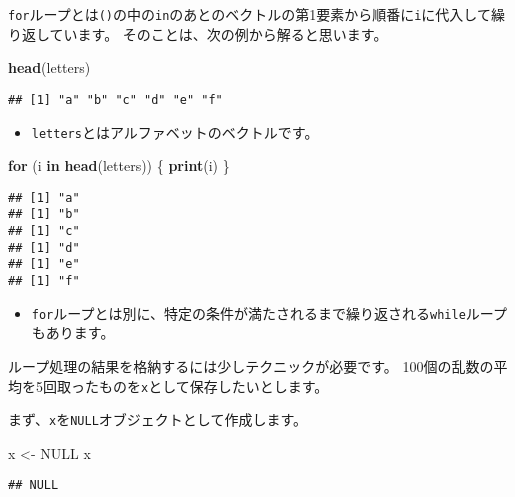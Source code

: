 \documentclass[]{bxjsarticle}
\newenvironment{Shaded}{\begin{snugshade}}{\end{snugshade}}
\newcommand{\ControlFlowTok}[1]{\textcolor[rgb]{0.13,0.29,0.53}{\textbf{#1}}}
\newcommand{\KeywordTok}[1]{\textcolor[rgb]{0.13,0.29,0.53}{\textbf{#1}}}
\newcommand{\NormalTok}[1]{#1}
\newcommand{\OtherTok}[1]{\textcolor[rgb]{0.56,0.35,0.01}{#1}}
\newcommand{\StringTok}[1]{\textcolor[rgb]{0.31,0.60,0.02}{#1}}
\providecommand{\tightlist}{%
  \setlength{\itemsep}{0pt}\setlength{\parskip}{0pt}}
\begin{document}
\texttt{for}ループとは\texttt{()}の中の\texttt{in}のあとのベクトルの第1要素から順番に\texttt{i}に代入して繰り返しています。
そのことは、次の例から解ると思います。

\begin{Shaded}
\begin{Highlighting}[]
\KeywordTok{head}\NormalTok{(letters)}
\end{Highlighting}
\end{Shaded}

\begin{verbatim}
## [1] "a" "b" "c" "d" "e" "f"
\end{verbatim}

\begin{itemize}
\tightlist
\item
  \texttt{letters}とはアルファベットのベクトルです。
\end{itemize}

\begin{Shaded}
\begin{Highlighting}[]
\ControlFlowTok{for}\NormalTok{ (i }\ControlFlowTok{in} \KeywordTok{head}\NormalTok{(letters)) \{}
  \KeywordTok{print}\NormalTok{(i)}
\NormalTok{\}}
\end{Highlighting}
\end{Shaded}

\begin{verbatim}
## [1] "a"
## [1] "b"
## [1] "c"
## [1] "d"
## [1] "e"
## [1] "f"
\end{verbatim}

\begin{itemize}
\tightlist
\item
  \texttt{for}ループとは別に、特定の条件が満たされるまで繰り返される\texttt{while}ループもあります。
\end{itemize}

ループ処理の結果を格納するには少しテクニックが必要です。
100個の乱数の平均を5回取ったものを\texttt{x}として保存したいとします。

まず、\texttt{x}を\texttt{NULL}オブジェクトとして作成します。

\begin{Shaded}
\begin{Highlighting}[]
\NormalTok{x <-}\StringTok{ }\OtherTok{NULL}
\NormalTok{x}
\end{Highlighting}
\end{Shaded}

\begin{verbatim}
## NULL
\end{verbatim}
\end{document}
